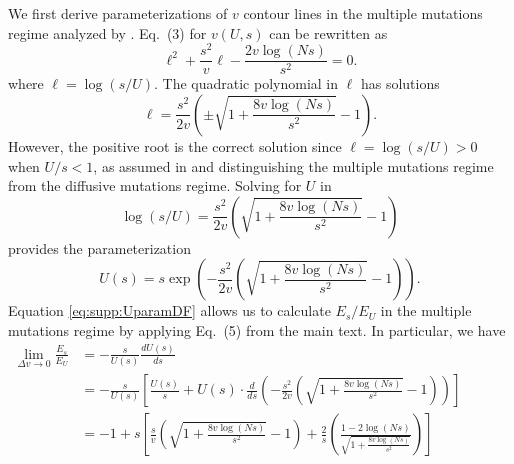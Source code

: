 \documentclass[11pt,onecolumn]{article}
\begin{document}
We first derive parameterizations of $v$ contour lines in the multiple mutations regime analyzed by \citet{desai2007beneficial}. Eq.~(3) for $v(U,s)$ can be rewritten as \[\ell^2+\frac{s^2}{v}\ell-\frac{2v\log(Ns)}{s^2}=0.\]
where $\ell=\log(s/U)$. The quadratic polynomial in $\ell$ has solutions
\[ \ell = \frac{s^2}{2v}\left(\pm \sqrt{1+\frac{8v\log(Ns)}{s^2}} -1 \right).\]
However, the positive root is the correct solution since $\ell = \log(s/U) >0$ when $U/s<1$, as assumed in \cite{desai2007beneficial} and distinguishing the multiple mutations regime from the diffusive mutations regime. Solving for $U$ in 
\[ \log(s/U) = \frac{s^2}{2v}\left(\sqrt{1+\frac{8v\log(Ns)}{s^2}}-1 \right)\]
provides the parameterization
\begin{equation} \label{eq:supp:UparamDF}
    U(s) = s\exp\left( -\frac{s^2}{2v} \left( \sqrt{1+\frac{8v\log(Ns)}{s^2}}-1\right) \right).
\end{equation}
Equation \eqref{eq:supp:UparamDF} allows us to calculate $E_s/E_U$ in the multiple mutations regime by applying Eq.~(5) from the main text. In particular, we have
\[
\begin{aligned}
\lim_{\Delta v\rightarrow 0}\frac{E_s}{E_U} &= -\frac{s}{U(s)}\frac{dU(s)}{ds}\\[4mm]
& = -\frac{s}{U(s)}\left[\frac{U(s)}{s}+U(s)\cdot\frac{d}{ds}\left( -\frac{s^2}{2v} \left( \sqrt{1+\frac{8v\log(Ns)}{s^2}}-1\right) \right) \right]\\[4mm]
& = -1+s\left[ \frac{s}{v} \left( \sqrt{1+\frac{8v\log(Ns)}{s^2}}-1\right) +\frac{2}{s} \left( \frac{1-2\log(Ns)}{\sqrt{1+\frac{8v\log(Ns)}{s^2}}}\right)\right]\hspace{1in}\\[4mm]
\end{aligned}
\]
\end{document}
